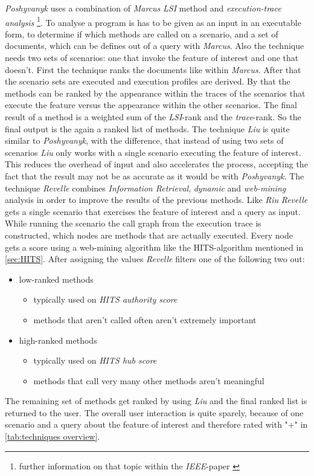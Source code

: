 \textit{Poshyvanyk} uses a combination of \textit{Marcus} \textit{LSI} method and \textit{execution-trace analysis} \footnote{further information on that topic within the \textit{IEEE}-paper \cite{antoniol2006feature}}. To analyse a program is has to be given as an input in an executable form, to determine if which methods are called on a scenario, and a set of documents, which can be defines out of a query with \textit{Marcus}. Also the technique needs two sets of scenarios: one that invoke the feature of interest and one that doesn't. First the technique ranks the documents like within \textit{Marcus}. After that the scenario sets are executed and execution profiles are derived. By that the methods can be ranked by the appearance within the traces of the scenarios that execute the feature versus the appearance within the other scenarios. The final result of a method is a weighted sum of the \textit{LSI}-rank and the \textit{trace}-rank. So the final output is the again a ranked list of methods. \cite{poshyvanyk2007feature} \newline
The technique \textit{Liu} is quite similar to \textit{Poshyvanyk}, with the difference, that instead of using two sets of scenarios \textit{Liu} only works with a single scenario executing the feature of interest. This reduces the overhead of input and also accelerates the process, accepting the fact that the result may not be as accurate as it would be with \textit{Poshyvanyk}. \cite{liu2007feature} \newline
The technique \textit{Revelle} combines \textit{Information Retrieval}, \textit{dynamic} and \textit{web-mining} analysis in order to improve the results of the previous methods. Like \textit{Riu} \textit{Revelle} gets a single scenario that exercises the feature of interest and a query as input. While running the scenario the call graph from the execution trace is constructed, which nodes are methods that are actually executed. Every node gets a score using a web-mining algorithm like the HITS-algorithm mentioned in \autoref{sec:HITS}. After assigning the values \textit{Revelle} filters one of the following two out:
\begin{itemize}
	\item low-ranked methods 
	\begin{itemize}
		\item typically used on \textit{HITS authority score}
		\item methods that aren't called often aren't extremely important
	\end{itemize}
	\item high-ranked methods 
	\begin{itemize}
		\item typically used on \textit{HITS hub score}
		\item  methods that call very many other methods aren't meaningful
	\end{itemize}
\end{itemize} 
The remaining set of methods get ranked by using \textit{Liu} and the final ranked list is returned to the user.
The overall user interaction is quite sparely, because of one scenario and a query about the feature of interest and therefore rated with "+" in \autoref{tab:techniques overview}. \cite{revelle2010using}

